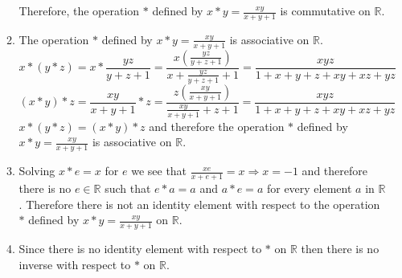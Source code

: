 \documentclass[12pt]{article}
\begin{document}
\begin{flushleft}
\begin{enumerate}
\begin{enumerate}
								Therefore, the operation $*$ defined by $x * y = \frac{xy}{x + y + 1}$ is commutative on $\mathbb{R}$.
							\item The operation $*$ defined by $x * y = \frac{xy}{x + y + 1}$ is associative on $\mathbb{R}$. \\
								$$x * (y *z) = x * \frac{yz}{y + z +1} = \frac{x\left( \frac{yz}{y+z+1} \right)}{x + \frac{yz}{y+z+1} + 1} = \frac{xyz}{1 + x + y + z + xy + xz +yz}$$
								$$(x * y) * z = \frac{xy}{x + y +1} * z = \frac{z\left( \frac{xy}{x+y+1} \right)}{\frac{xy}{x+y+1} + z + 1} = \frac{xyz}{1 + x + y + z + xy + xz +yz}$$
								$x * (y * z) = (x * y) * z$ and therefore the operation $*$ defined by $x * y = \frac{xy}{x + y + 1}$ is associative on $\mathbb{R}$.
							\item Solving $x*e = x$ for $e$ we see that $\frac{xe}{x + e +1} = x \Rightarrow x = -1$ and therefore there is 
								no $e \in \mathbb{R}$ such that $e * a = a$ and $a * e = a$ for every element $a$ in $\mathbb{R}$. Therefore 
								there is not an identity element with respect to the operation $*$ defined by $x * y = \frac{xy}{x + y + 1}$ on $\mathbb{R}$.
							\item Since there is no identity element with respect to $*$ on $\mathbb{R}$ then there is no inverse with respect to $*$ on $\mathbb{R}$.
						\end{enumerate}
					\end{enumerate}
					


\end{flushleft}
\end{document}

